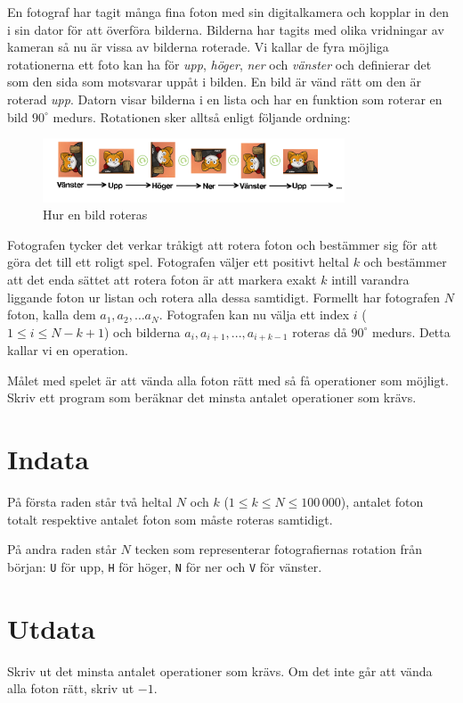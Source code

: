 En fotograf har tagit många fina foton med sin digitalkamera och kopplar in den
i sin dator för att överföra bilderna. Bilderna har tagits med olika vridningar
av kameran så nu är vissa av bilderna roterade. Vi kallar de fyra möjliga
rotationerna ett foto kan ha för \emph{upp}, \emph{höger}, \emph{ner} och \emph{vänster} och
definierar det som den sida som motsvarar uppåt i bilden. En bild är vänd rätt
om den är roterad \emph{upp}. Datorn visar bilderna i en lista och har en funktion
som roterar en bild $90^\circ$ medurs. Rotationen sker alltså enligt följande ordning:

\begin{figure}[h!]
    \centering
    \includegraphics[width=0.8\textwidth]{fotografen.png}
\caption{Hur en bild roteras}
\label{fig:rotatingcat}
\end{figure}


Fotografen tycker det verkar tråkigt att rotera foton och bestämmer sig för att
göra det till ett roligt spel. Fotografen väljer ett positivt heltal $k$ och
bestämmer att det enda sättet att rotera foton är att markera exakt $k$ intill varandra liggande foton ur listan och rotera alla dessa samtidigt. Formellt har fotografen $N$ foton, kalla dem $a_1, a_2, \dots
a_N$. Fotografen kan nu välja ett index $i$ ($1 \leq i \leq N-k+1$)
och bilderna $a_i, a_{i+1}, ... , a_{i+k-1}$ roteras då $90^\circ$ medurs. Detta kallar vi en
operation.

Målet med spelet är att vända alla foton rätt med så få operationer som
möjligt. Skriv ett program som beräknar det minsta antalet operationer som krävs.

\section*{Indata}
På första raden står två heltal $N$ och $k$ ($1 \leq k \leq N \leq 100\,000$),
antalet foton totalt respektive antalet foton som måste roteras samtidigt.

På andra raden står $N$ tecken som representerar fotografiernas rotation från
början: \texttt{U} för upp, \texttt{H} för höger, \texttt{N} för ner och
\texttt{V} för vänster.

\section*{Utdata}
Skriv ut det minsta antalet operationer som krävs. Om det inte går att vända
alla foton rätt, skriv ut $-1$.


